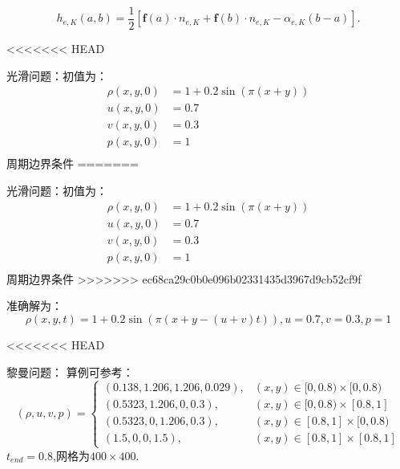 \documentclass{book}
\begin{document}
\begin{example}
\begin{example}{}{}
\begin{example}
\begin{equation}
    h_{e, K}(a, b)=\frac{1}{2}\left[\mathbf{f}(a) \cdot n_{e, K}+\mathbf{f}(b) \cdot n_{e, K}-\alpha_{e, K}(b-a)\right] .
\end{equation}

<<<<<<< HEAD
\begin{example}
光滑问题：初值为：
\begin{equation}
    \begin{aligned}
        \rho(x,y,0) & = 1+0.2\sin(\pi(x+y)) \\
        u(x,y,0)    & = 0.7                 \\
        v(x,y,0)    & = 0.3                 \\
        p(x,y,0)    & = 1                   \\
    \end{aligned}
\end{equation}
周期边界条件
=======
\begin{example}{}{}
    光滑问题：初值为：
    \begin{equation}
        \begin{aligned}
            \rho(x,y,0) & = 1+0.2\sin(\pi(x+y)) \\
            u(x,y,0)    & = 0.7                 \\
            v(x,y,0)    & = 0.3                 \\
            p(x,y,0)    & = 1                   \\
        \end{aligned}
    \end{equation}
    周期边界条件
    >>>>>>> ec68ca29c0b0e096b02331435d3967d9cb52cf9f

    准确解为：
    \begin{equation}
        \rho(x,y,t) = 1+0.2\sin(\pi(x+y-(u+v)t)),u=0.7,v=0.3,p=1
    \end{equation}
\end{example}



<<<<<<< HEAD
\begin{example}黎曼问题：
算例可参考：\cite{RN114}
\begin{equation}
    (\rho, u, v, p)=\begin{cases}
        (0.138,1.206,1.206,0.029), & (x, y) \in[0,0.8) \times[0,0.8) \\
        (0.5323,1.206,0,0.3),      & (x, y) \in[0,0.8) \times[0.8,1] \\
        (0.5323,0,1.206,0.3),      & (x, y) \in[0.8,1] \times[0,0.8) \\
        (1.5,0,0,1.5),             & (x, y) \in[0.8,1] \times[0.8,1]
    \end{cases}
\end{equation}
$t_{end}=0.8$,网格为$400\times400$.


\end{example}
\end{example}
\end{example}
\end{example}
\end{example}
\end{document}
